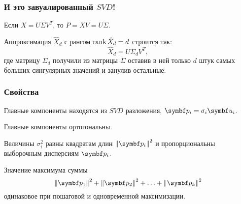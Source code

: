 \begin{frame}
  \frametitle{И это завуалированный $SVD$!}

  Если $X = U\Sigma V^T$, то $P = XV = U\Sigma$. \pause


  Аппроксимация $\hat X_d$ с рангом $\rank \hat X_d = d$ строится так:
  \[
  \hat X_d = U \Sigma_d V^T,  
  \]
  где матрицу $\Sigma_d$ получили из матрицы $\Sigma$ оставив в ней только $d$ штук
  самых больших сингулярных значений и занулив остальные.


\end{frame}



\begin{frame}
  \frametitle{Свойства}

  Главные компоненты находятся из $SVD$ разложения, $\bp_i = \sigma_i \bu_i$. 

  Главные компоненты ортогональны. 

  Величины $\sigma^2_i$ равны квадратам длин $\norm{\bp_i}^2$ 
  и пропорциональны выборочным дисперсиям $\bp_i$.  \pause

  Значение максимума суммы 
  \[
    \norm{\bp_1}^2 + \norm{\bp_2}^2 + \ldots + \norm{\bp_k}^2
  \]
  одинаковое при пошаговой и одновременной максимизации.


\end{frame}

